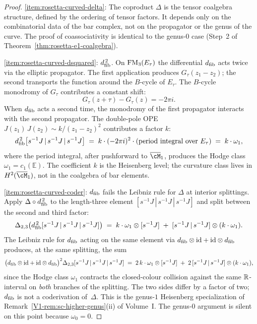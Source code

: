 \begin{proof}
\ref{item:rosetta-curved-delta}:
The coproduct $\Delta$ is the tensor coalgebra structure,
defined by the ordering of tensor factors. It depends only on
the combinatorial data of the bar complex, not on the
propagator or the genus of the curve. The proof of
coassociativity is identical to the genus-$0$ case (Step~2 of
Theorem~\ref{thm:rosetta-e1-coalgebra}).

\medskip
\ref{item:rosetta-curved-dsquared}: $d_{\mathrm{fib}}^{\,2}$.
On $\mathrm{FM}_3(E_\tau)$ the differential $d_{\mathrm{fib}}$ acts twice via the elliptic propagator. The first application produces $G_\tau(z_1 - z_2)$; the second transports the function around the $B$-cycle of $E_\tau$. The $B$-cycle monodromy of $G_\tau$ contributes a constant shift:
\begin{equation}\label{eq:rosetta-monodromy}
G_\tau(z + \tau) - G_\tau(z) = -2\pi i.
\end{equation}
When $d_{\mathrm{fib}}$ acts a second time, the monodromy of the first propagator interacts with the second propagator. The double-pole OPE $J(z_1)\, J(z_2) \sim k/(z_1 - z_2)^2$ contributes a factor $k$:
\begin{equation}\label{eq:rosetta-dsquared-computation}
d_{\mathrm{fib}}^{\,2}\bigl[s^{-1}J \,|\, s^{-1}J \,|\, s^{-1}J\bigr]
\;=\;
k \cdot (-2\pi i)^2 \cdot
\left(
 \text{period integral over } E_\tau
\right)
\;=\;
k \cdot \omega_1,
\end{equation}
where the period integral, after pushforward to $\overline{\cM}_1$, produces the Hodge class $\omega_1 = c_1(\mathbb{E})$. The coefficient $k$ is the Heisenberg level; the curvature class lives in $H^2(\overline{\cM}_1)$, not in the coalgebra of bar elements.

\medskip
\ref{item:rosetta-curved-coder}: $d_{\mathrm{fib}}$ fails the Leibniz rule for $\Delta$ at interior splittings. Apply $\Delta\circ d_{\mathrm{fib}}^{\,2}$ to the length-three element $[s^{-1}J\,|\,s^{-1}J\,|\,s^{-1}J]$ and split between the second and third factor:
\[
\Delta_{2{,}3}\bigl(d_{\mathrm{fib}}^{\,2}[s^{-1}J\,|\,s^{-1}J\,|\,s^{-1}J]\bigr)
\;=\;
k\cdot\omega_1\otimes [s^{-1}J]
\;+\;
[s^{-1}J\,|\,s^{-1}J]\otimes(k\cdot\omega_1).
\]
The Leibniz rule for $d_{\mathrm{fib}}$ acting on the same element via
$d_{\mathrm{fib}}\otimes\mathrm{id} + \mathrm{id}\otimes d_{\mathrm{fib}}$ produces, at the same
splitting, the sum
\[
\bigl(d_{\mathrm{fib}}\otimes\mathrm{id} + \mathrm{id}\otimes d_{\mathrm{fib}}\bigr)^{2}\Delta_{2{,}3}
[s^{-1}J\,|\,s^{-1}J\,|\,s^{-1}J]
\;=\;
2\,k\cdot\omega_1\otimes [s^{-1}J]
\;+\;
2\,[s^{-1}J\,|\,s^{-1}J]\otimes(k\cdot\omega_1),
\]
since the Hodge class $\omega_1$ contracts the closed-colour collision against the same $\mathbb{R}$-interval on \emph{both} branches of the splitting. The two sides differ by a factor of two; $d_{\mathrm{fib}}$ is not a coderivation of~$\Delta$. This is the genus-$1$ Heisenberg specialization of Remark~\ref{V1-rem:sc-higher-genus}\textup{(ii)} of Volume~I. The genus-$0$ argument is silent on this point because $\omega_0 = 0$.


\end{proof}
